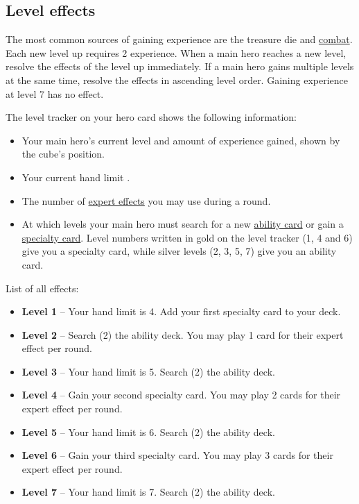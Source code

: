 \documentclass[12pt]{article}
\def\assets{assets}
\def\svgs{\assets/svgs}
\begin{document}
\subsection*{\hypertarget{Level}{Level effects}}
The most common sources of gaining experience are the treasure die and \hyperlink{Combatexperience}{combat}. Each new level up requires 2 experience. When a main hero reaches a new level, resolve the effects of the level up immediately. If a main hero gains multiple levels at the same time, resolve the effects in ascending level order. Gaining experience at level 7 has no effect.\par
The level tracker on your hero card shows the following information:
\begin{itemize}
\item Your main hero’s current level and amount of experience gained, shown by the cube's position.
\item Your current hand limit .
\item The number of \hyperlink{Ability}{expert effects}  you may use during a round.
\item At which levels your main hero must search for a new \hyperlink{Ability}{ability card} or gain a \hyperlink{Specialty}{specialty card}. Level numbers written in gold on the level tracker (1, 4 and 6) give you a specialty card, while silver levels (2, 3, 5, 7) give you an ability card.
\end{itemize}
List of all effects:
\begin{itemize}
\item \textbf{Level 1} – Your hand limit is 4. Add your first specialty card to your deck.
\item \textbf{Level 2} – Search (2) the ability deck. You may play 1 card for their expert effect per round.
\item \textbf{Level 3} – Your hand limit is 5. Search (2) the ability deck.
\item \textbf{Level 4} – Gain your second specialty card. You may play 2 cards for their expert effect per round.
\item \textbf{Level 5} – Your hand limit is 6. Search (2) the ability deck.
\item \textbf{Level 6} – Gain your third specialty card. You may play 3 cards for their expert effect per round.
\item \textbf{Level 7} – Your hand limit is 7. Search (2) the ability deck.
\end{itemize}
\end{document}
